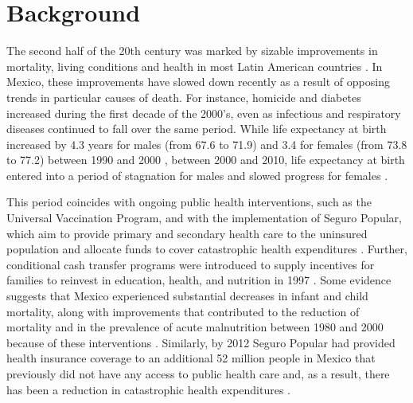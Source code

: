 \documentclass{bmcart}
\begin{document}



\section*{Background}
The second half of the 20th century was marked by sizable improvements in mortality, living
conditions and health in most Latin American countries \cite{who2000}. 
In Mexico, these improvements have slowed down recently as a result of opposing
trends in particular causes of death. For instance, homicide and diabetes
increased during the first decade of the 2000's, even as infectious and
respiratory diseases continued to fall over the same period. While life
expectancy at birth increased by 4.3 years for males (from 67.6 to 71.9) and 3.4
for females (from 73.8 to 77.2) between 1990 and 2000 \cite{SOMEDE},
between 2000 and 2010, life expectancy at birth entered into a period of
stagnation for males and slowed progress for females \cite{canudas2014}. 


This
period coincides with ongoing public health interventions, such as the Universal Vaccination Program, and with the implementation of Seguro
Popular, which aim to provide primary and secondary
health care to the uninsured population and allocate funds to cover catastrophic
health expenditures \cite{knaul2005}. Further, conditional cash transfer programs were introduced to supply incentives for families to reinvest in education, health, and nutrition in 1997 \cite{neufeld2012}. Some evidence
suggests that Mexico experienced substantial decreases in infant and child
mortality, along with improvements that contributed to the reduction of
mortality and in the prevalence of acute malnutrition between 1980 and 2000
because of these interventions \cite{sepulveda2006}. Similarly, by 2012 Seguro Popular had provided health insurance coverage to an additional 52 million
people in Mexico that previously did not have any access to public health care and, as a result, there has been a reduction in catastrophic health expenditures \cite{knaul2012}.
\end{document}
